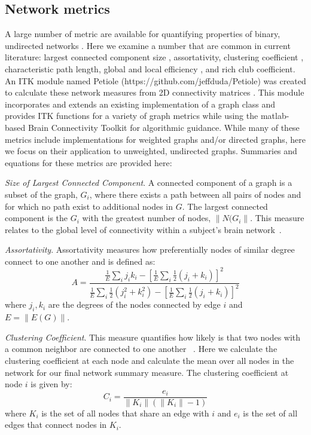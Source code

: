 \documentclass{frontiersSCNS} %
\begin{document}
\subsection{Network metrics}
A large number of metric are available for quantifying properties of binary, undirected networks \citep{Rubinov2010}. Here we examine a number that 
are common in current literature: largest connected component size \citep{Basset2011}, assortativity\citep{Newwan2006,Basset2008}, clustering coefficient \citep{Watts1998}, characteristic path length\citep{Watts1998}, global and local efficiency \citep{Latora2001}, and rich club coefficient\citep{RichClub}. An ITK module named Petiole (https://github.com/jeffduda/Petiole) was created to calculate these network measures from 2D connectivity
matrices \citep{Petiole}. This module incorporates and extends an existing implementation of a graph class \citep{NickITKJournal} and provides ITK functions for a variety of graph metrics while using the matlab-based Brain Connectivity Toolkit \citep{BCT} for algorithmic guidance. While many of these metrics include implementations for weighted graphs and/or directed graphs, here we focus on their application to unweighted, undirected graphs. Summaries and equations for these metrics are provided here:

\emph{Size of Largest Connected Component}.  A connected component of a graph is a subset of the graph, $G_{i}$, where there exists a path between all pairs of nodes and for which no path exist to additional nodes in $G$. The largest connected component is the $G_{i}$ with the greatest number of nodes, $\|N(G_{i}\|$. This measure relates to the global level of connectivity within a subject's brain network~\cite{Basset2011}.


\emph{Assortativity}. Assortativity measures how preferentially nodes of similar degree connect to one another \citep{Newman2006} and is defined as:
$$A =  \frac{ \frac{1}{E} \sum_{i}{j_i k_i} - [ \frac{1}{E} \sum_{i}{ \frac{1}{2} (j_i + k_i)} ]^2 }{ \frac{1}{E} \sum_{i}{ \frac{1}{2}( j_{i}^{2} + k_{i}^{2} ) } - [ \frac{1}{E} \sum_{i}{ \frac{1}{2} (j_i + k_i)} ]^2  } $$
where $j_i,k_i$ are the degrees of the nodes connected by edge $i$ and $E = \|E(G)\|$.

\emph{Clustering Coefficient}. This measure quantifies how likely is that two nodes with a common neighbor are connected to one another ~\citep{Watts1998}. Here we calculate the clustering coefficient at each node and calculate the mean over all nodes in the network for our final network summary measure. The clustering coefficient at node $i$ is given by:
$$C_i = \frac{e_i}{\|K_i\| ( \|K_i\| -1 )}$$
where $K_i$ is the set of all nodes that share an edge with $i$ and $e_i$ is the set of all edges that connect nodes in $K_i$.
\end{document}
